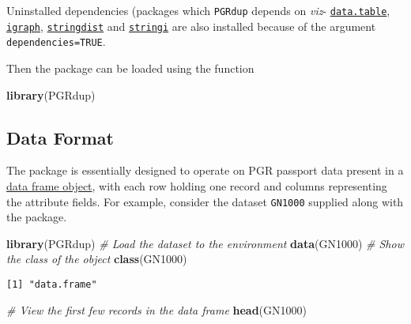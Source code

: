\documentclass[]{article}
\newenvironment{Shaded}{\begin{snugshade}}{\end{snugshade}}
\newcommand{\CommentTok}[1]{\textcolor[rgb]{0.56,0.35,0.01}{\textit{#1}}}
\newcommand{\KeywordTok}[1]{\textcolor[rgb]{0.13,0.29,0.53}{\textbf{#1}}}
\newcommand{\NormalTok}[1]{#1}
\begin{document}
Uninstalled dependencies (packages which \texttt{PGRdup} depends on
\emph{viz}-
\href{https://CRAN.R-project.org/package=data.table}{\texttt{data.table}},
\href{https://CRAN.R-project.org/package=igraph}{\texttt{igraph}},
\href{https://CRAN.R-project.org/package=stringdist}{\texttt{stringdist}}
and \href{https://CRAN.R-project.org/package=stringi}{\texttt{stringi}}
are also installed because of the argument \texttt{dependencies=TRUE}.

Then the package can be loaded using the function

\begin{Shaded}
\begin{Highlighting}[]
\KeywordTok{library}\NormalTok{(PGRdup)}
\end{Highlighting}
\end{Shaded}

\hypertarget{data-format}{%
\subsection{Data Format}\label{data-format}}

The package is essentially designed to operate on PGR passport data
present in a \href{http://google.com/\#q=\%5BR\%5D+data.frame}{data
frame object}, with each row holding one record and columns representing
the attribute fields. For example, consider the dataset \texttt{GN1000}
supplied along with the package.

\begin{Shaded}
\begin{Highlighting}[]
\KeywordTok{library}\NormalTok{(PGRdup)}
\CommentTok{# Load the dataset to the environment}
\KeywordTok{data}\NormalTok{(GN1000)}
\CommentTok{# Show the class of the object}
\KeywordTok{class}\NormalTok{(GN1000)}
\end{Highlighting}
\end{Shaded}

\begin{verbatim}
[1] "data.frame"
\end{verbatim}

\begin{Shaded}
\begin{Highlighting}[]
\CommentTok{# View the first few records in the data frame}
\KeywordTok{head}\NormalTok{(GN1000)}
\end{Highlighting}
\end{Shaded}
\end{document}
